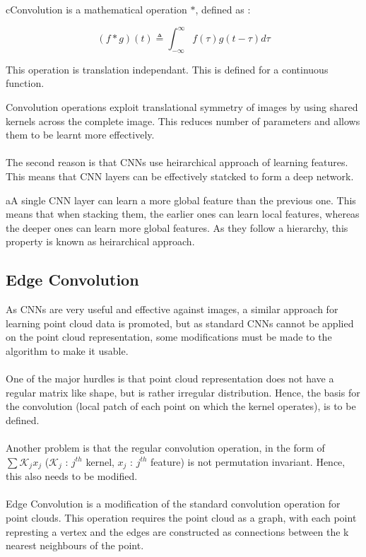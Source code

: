 \begin{definition}
    cConvolution is a mathematical operation $*$, defined as :

    \begin{equation*}
        (f*g)(t) \triangleq \int_{-\infty}^{\infty} f(\tau)g(t - \tau) d\tau
    \end{equation*}

    \noindent This operation is translation independant. This is defined for 
    a continuous function.
\end{definition}

\noindent Convolution operations exploit translational symmetry of images 
by using shared kernels across the complete image. This reduces 
number of parameters and allows them to be learnt more effectively.
\\\\
The second reason is that CNNs use heirarchical approach of learning features. 
This means that CNN layers can be effectively statcked to form a deep network.

\begin{note}
    aA single CNN layer can learn a more global feature than the previous one. 
    This means that when stacking them, the earlier ones can learn local 
    features, whereas the deeper ones can learn more global features. As they 
    follow a hierarchy, this property is known as heirarchical approach.
\end{note}

\subsection{Edge Convolution}
As CNNs are very useful and effective against images, a similar approach for 
learning point cloud data is promoted, but as standard CNNs cannot be applied 
on the point cloud representation, some modifications must be made to the 
algorithm to make it usable.
\\\\
One of the major hurdles is that point cloud representation does not have 
a regular matrix like shape, but is rather irregular distribution. Hence, 
the basis for the convolution (local patch of each point on which the 
kernel operates), is to be defined.
\\\\
Another problem is that the regular convolution operation, in the form of 
$\sum \mathcal{K}_jx_j$ ($\mathcal{K}_j$ : $j^{th}$ kernel, $x_j$ : $j^{th}$ 
feature) is not permutation invariant. Hence, this also needs to be 
modified.
\\\\
Edge Convolution is a modification of the standard convolution operation 
for point clouds. This operation requires the point cloud as a graph, with 
each point represting a vertex and the edges are constructed as connections 
between the k nearest neighbours of the point.

